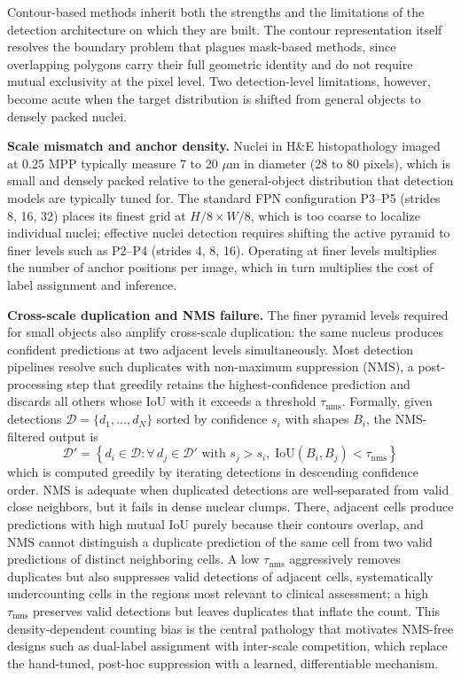 \label{sec:limitations-nuclei}

Contour-based methods inherit both the strengths and the limitations of the detection architecture on which they are built. The contour representation itself resolves the boundary problem that plagues mask-based methods, since overlapping polygons carry their full geometric identity and do not require mutual exclusivity at the pixel level. Two detection-level limitations, however, become acute when the target distribution is shifted from general objects to densely packed nuclei.

\textbf{Scale mismatch and anchor density.} Nuclei in H\&E histopathology imaged at 0.25 MPP typically measure 7 to 20 $\mu$m in diameter (28 to 80 pixels), which is small and densely packed relative to the general-object distribution that detection models are typically tuned for. The standard FPN configuration P3--P5 (strides 8, 16, 32) places its finest grid at $H/8 \times W/8$, which is too coarse to localize individual nuclei; effective nuclei detection requires shifting the active pyramid to finer levels such as P2--P4 (strides 4, 8, 16). Operating at finer levels multiplies the number of anchor positions per image, which in turn multiplies the cost of label assignment and inference.

\textbf{Cross-scale duplication and NMS failure.} The finer pyramid levels required for small objects also amplify cross-scale duplication: the same nucleus produces confident predictions at two adjacent levels simultaneously. Most detection pipelines resolve such duplicates with non-maximum suppression (NMS), a post-processing step that greedily retains the highest-confidence prediction and discards all others whose IoU with it exceeds a threshold $\tau_{\text{nms}}$. Formally, given detections $\mathcal{D} = \{d_1, \ldots, d_N\}$ sorted by confidence $s_i$ with shapes $B_i$, the NMS-filtered output is
\begin{equation}
    \mathcal{D}' = \left\{ d_i \in \mathcal{D} : \forall\, d_j \in \mathcal{D}' \text{ with } s_j > s_i,\; \text{IoU}(B_i, B_j) < \tau_{\text{nms}} \right\}
\end{equation}
which is computed greedily by iterating detections in descending confidence order. NMS is adequate when duplicated detections are well-separated from valid close neighbors, but it fails in dense nuclear clumps. There, adjacent cells produce predictions with high mutual IoU purely because their contours overlap, and NMS cannot distinguish a duplicate prediction of the same cell from two valid predictions of distinct neighboring cells. A low $\tau_{\text{nms}}$ aggressively removes duplicates but also suppresses valid detections of adjacent cells, systematically undercounting cells in the regions most relevant to clinical assessment; a high $\tau_{\text{nms}}$ preserves valid detections but leaves duplicates that inflate the count. This density-dependent counting bias is the central pathology that motivates NMS-free designs such as dual-label assignment with inter-scale competition, which replace the hand-tuned, post-hoc suppression with a learned, differentiable mechanism.

